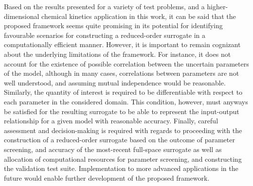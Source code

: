 Based on the results presented for a variety of test problems, 
and a higher-dimensional chemical kinetics application in this work, it can be said that the
proposed framework seems quite promising in its potential for identifying favourable
scenarios for constructing a reduced-order surrogate in a computationally efficient manner. 
However, it is important to remain cognizant about the underlying limitations of the
framework. For instance, it does not account for the existence of possible correlation 
between the uncertain parameters of the model, although in many cases, correlations
between parameters are not well understood, and assuming mutual independence 
would be reasonable. Similarly, the quantity of interest is required to be differentiable
with respect to each parameter in the considered domain. This condition, however, must
anyways be satisfied for the resulting surrogate to be able to represent the input-output
relationship for a given model with reasonable accuracy. Finally, careful assessment 
and decision-making is required with regards to proceeding with the
construction of a reduced-order surrogate based on the outcome of parameter
screening, and accuracy of the most-recent full-space surrogate as well as 
allocation of computational resources for parameter screening, and constructing the
validation test suite. Implementation to more advanced
applications in the future would enable further development of the proposed framework. 

















